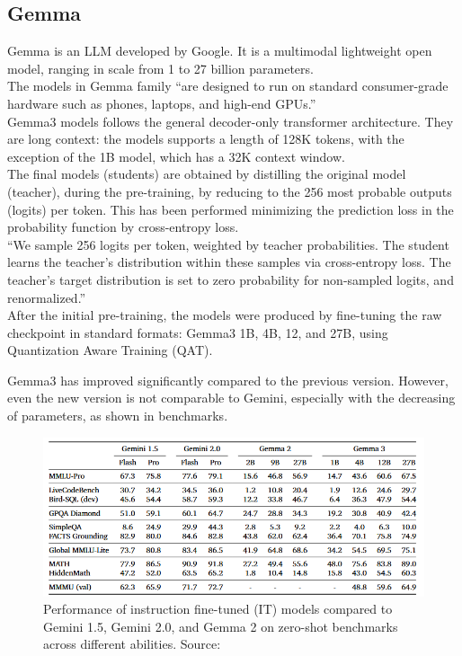 \documentclass[12pt]{article}
\begin{document}
    \subsection{Gemma}
Gemma is an LLM developed by Google. It is a multimodal lightweight open model, ranging in scale from 1 to 27 billion parameters.\\
The models in Gemma family ``are designed to run on standard
consumer-grade hardware such as phones, laptops, and high-end GPUs.''\cite{gemmateam2025gemma3technicalreport}\\
Gemma3 models follows the general decoder-only transformer architecture.\cite{vaswani2023attentionneed} They are long context: the models supports a length of 128K tokens, with the exception of the 1B model, which has a 32K context window.\\
The final models (students) are obtained by distilling the original model (teacher), during the pre-training, by reducing to the 256 most probable outputs (logits) per token. This has been performed minimizing the prediction loss in the probability function by cross-entropy loss.\\
``We sample 256 logits per token, weighted by teacher probabilities. The student learns the teacher’s distribution within these samples via cross-entropy loss. The teacher’s target distribution is set to zero probability for non-sampled logits, and renormalized.''\cite{gemmateam2025gemma3technicalreport}\\
After the initial pre-training, the models were produced by fine-tuning the raw checkpoint in standard formats: Gemma3 1B, 4B, 12, and 27B, using Quantization Aware Training (QAT).

Gemma3 has improved significantly compared to the previous version. However, even the new version is not comparable to Gemini, especially with the decreasing of parameters, as shown in benchmarks.\\

    \begin{figure}[H]
    \centering
            \includegraphics[width=1\textwidth]{Gemma3Benchmarks.png}
    \caption[Gemma3 benchmarks]{Performance of instruction fine-tuned (IT) models compared to Gemini 1.5, Gemini 2.0, and Gemma 2 on zero-shot benchmarks across different abilities. Source: \cite{gemmateam2025gemma3technicalreport}}
    \end{figure}    
\end{document}
